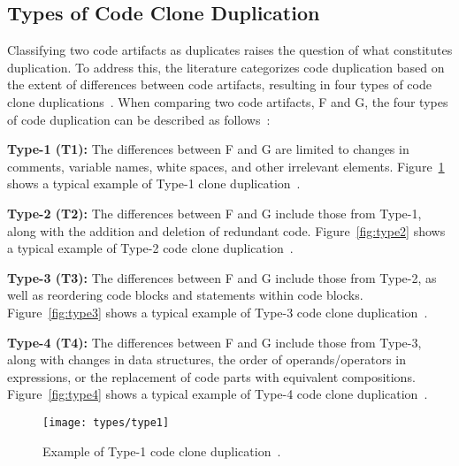 \subsection{Types of Code Clone Duplication}
\label{subsec:types}

Classifying two code artifacts as duplicates raises the question of
what constitutes duplication. To address this, the literature categorizes code
duplication based on the extent of differences between code artifacts,
resulting in four types of code clone duplications~\citep{litreview}. When
comparing two code artifacts, F and G, the four types of code duplication can
be described as follows~\citep{litreview}:

\begin{itemize}
    \begin{item}
	\textbf{Type-1 (T1):} The differences between F and G are limited to
	    changes in comments, variable names, white spaces, and other
	    irrelevant elements. Figure~\ref{fig:type1} shows a typical example
	    of Type-1 clone duplication~\citep{litreview}.
    \end{item}
    \begin{item}
	\textbf{Type-2 (T2):} The differences between F and G include those
	    from Type-1, along with the addition and deletion of redundant
	    code. Figure~\ref{fig:type2} shows a typical example of Type-2 code
	    clone duplication~\citep{litreview}.
    \end{item}
    \begin{item}
	\textbf{Type-3 (T3):} The differences between F and G include those
	    from Type-2, as well as reordering code blocks and statements
	    within code blocks. Figure~\ref{fig:type3} shows a typical example
	    of Type-3 code clone duplication~\citep{litreview}.
    \end{item}
    \begin{item}
	\textbf{Type-4 (T4):} The differences between F and G include those
	    from Type-3, along with changes in data structures, the order of
	    operands/operators in expressions, or the replacement of code parts
	    with equivalent compositions. Figure~\ref{fig:type4} shows a
	    typical example of Type-4 code clone duplication~\citep{litreview}.
    \end{item}
\end{itemize}

\begin{figure}[ht]
\texttt{[image: types/type1]}
\caption{Example of Type-1 code clone duplication~\citep{litreview}.}
\label{fig:type1}
\end{figure}

